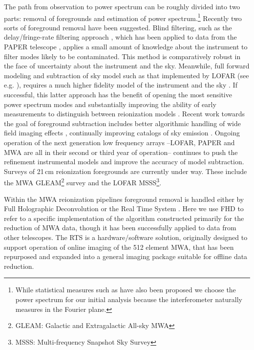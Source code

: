 \documentclass[preprint2]{aastex}
\begin{document}
The path from observation to power spectrum can be roughly divided into two parts: removal of foregrounds and estimation of power spectrum.\footnote{While statistical measures  such as \citet{Barkana:2008p2154} have also been proposed we choose the power spectrum for our initial analysis because the interferometer naturally measures in the Fourier plane.}  Recently two sorts of foreground removal have been suggested. Blind filtering, such as the delay/fringe-rate filtering approach \cite{Parsons:2012p8896,Liu:2014p10462,Liu:2014p10463},  which has been applied to data from the PAPER telescope \cite{Parsons:2014p10499}, applies a small amount of knowledge about the instrument to filter modes likely to be contaminated.  This method is comparatively robust in the face of uncertainty about the instrument and the sky. Meanwhile,  full forward modeling and subtraction of sky model such as that implemented by LOFAR (see e.g. \cite{Jelic:2008p2130,Yatawatta:2013p9699}), requires a much higher fidelity model of the instrument and the sky \citep{Datta:2010p8781,Vedantham:2012p10297}. If successful, this latter approach has the benefit of opening the most sensitive power spectrum modes and substantially improving the ability of early measurements to distinguish between reionization models \cite{Beardsley:2013p9952,Pober:2014p10390}. Recent work towards the goal of foreground subtraction includes better algorithmic handling of wide field imaging effects \cite{Tasse:2012p9459,Bhatnagar..2013ApJ,Sullivan:2012p9457,Ord:2010p8442}, continually improving catalogs of sky emission \citep{deOliveiraCosta:2008p2242,Jacobs:2011p8438}. Ongoing operation of the next generation low frequency arrays --LOFAR, PAPER and MWA are all in their second or third year of operation-- continues to push the refinement instrumental models and improve the accuracy of model subtraction.  Surveys of 21\,cm reionization foregrounds are currently under way. These include the MWA GLEAM\footnote{GLEAM: Galactic and Extragalactic All-sky MWA} survey  and the LOFAR MSSS\footnote{MSSS: Multi-frequency Snapshot Sky Survey}.   %

Within the MWA reionization pipelines foreground removal is handled either by Full Holographic Deconvolution \citep[FHD]{Sullivan:2012p9457} or the Real Time System \citep[RTS]{Ord:2010p8442}.  Here we use FHD to refer to a specific implementation of the algorithm constructed primarily for the reduction of MWA data, though it has been successfully applied to data from other telescopes.  The RTS is a hardware/software solution, originally designed to support operation of online imaging of the 512 element MWA, that has been repurposed and expanded into a general imaging package suitable for offline data reduction.
\end{document}
